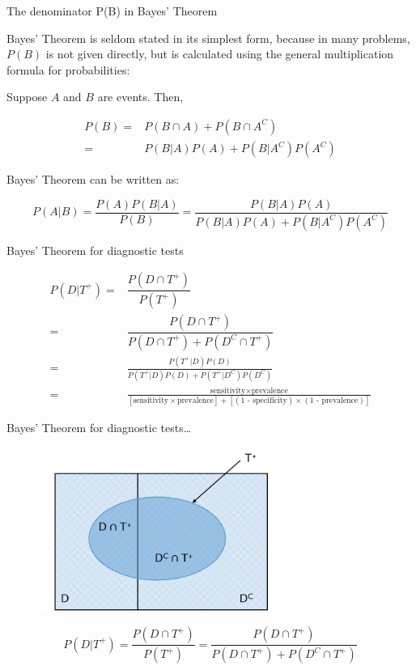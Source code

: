 \documentclass[ignorenonframetext,aspectratio=169]{beamer}
\begin{document}
\begin{frame}{The denominator P(B) in Bayes' Theorem}

Bayes' Theorem is seldom stated in its simplest form, because in many
problems, \(P(B)\) is not given directly, but is calculated using the
general multiplication formula for probabilities:

Suppose \(A\) and \(B\) are events. Then,

\begin{align*}
P(B) = & P(B \cap A) + P(B \cap A^C) \\
    = & P(B | A)P(A)+ P(B|A^C)P(A^C)
\end{align*}

Bayes' Theorem can be written as:

\[P(A|B) = \frac{P(A) P(B|A)}{P(B)} = \frac{P (B|A)P(A)}{P (B | A)P(A) + P (B|A^C)P(A^C)} \]

\end{frame}

\begin{frame}{Bayes' Theorem for diagnostic tests}

\begin{align*}
  P(D|T^+) = & \dfrac{P(D \cap T^{+})}{P(T^+)} \\ 
  =& \dfrac{P(D \cap T^{+})}{P(D \cap T^{+}) + P(D^C \cap T^{+})} \\
  = & \frac{P(T^{+}|D)P(D)}{P(T^{+}|D)P(D)+
    P(T^{+}|D^{C})P(D^C)} \\
  = & \frac{\text{sensitivity} \times \text{prevalence}}{[\text{sensitivity} \times \text{prevalence}] + [(\text{1 - specificity}) \times (\text{1 - prevalence})]}  
\end{align*}

\end{frame}

\begin{frame}{Bayes' Theorem for diagnostic tests\ldots{}}

\begin{center}
\begin{figure}
\includegraphics[width=3in]{figures/bayesVenn}
\end{figure}
\end{center}

\[P(D|T^+) = \dfrac{P(D \cap T^{+})}{P(T^+)} = \dfrac{P(D \cap T^{+})}{P(D \cap T^{+}) + P(D^C \cap T^{+})}\]

\end{frame}
\end{document}
